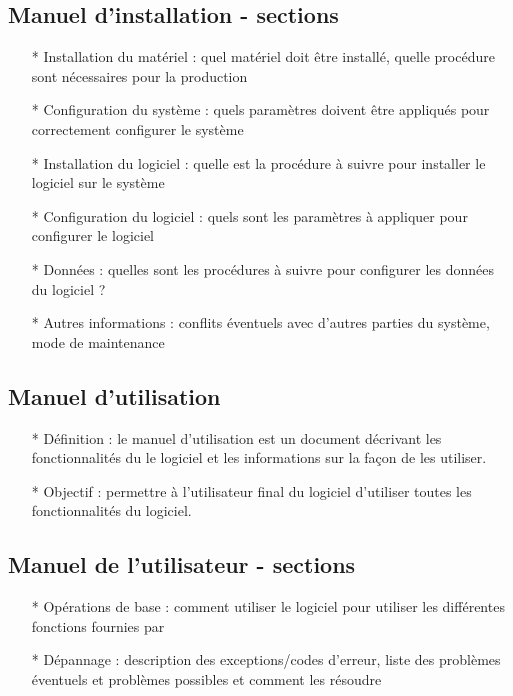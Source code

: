 \documentclass[12pt]{article}
\begin{document}
\subsection{Manuel d'installation - sections}
\begin{itemize}
	\item[* ] Installation du matériel : quel matériel doit être installé, quelle procédure
	sont nécessaires pour la production
	\item[* ] Configuration du système : quels paramètres doivent être appliqués pour correctement
	configurer le système
	\item[* ] Installation du logiciel : quelle est la procédure à suivre pour installer le logiciel sur le
	système
	\item[* ] Configuration du logiciel : quels sont les paramètres à appliquer pour 
	configurer le logiciel
	\item[* ] Données : quelles sont les procédures à suivre pour configurer les données du logiciel ?
	\item[* ] Autres informations : conflits éventuels avec d'autres parties du système,
	mode de maintenance
\end{itemize}
\subsection{Manuel d'utilisation}
\begin{itemize}
	\item[* ] Définition : le manuel d'utilisation est un document décrivant les fonctionnalités du
	le logiciel et les informations sur la façon de les utiliser.
	\item[* ] Objectif : permettre à l'utilisateur final du logiciel d'utiliser toutes les fonctionnalités du logiciel.

\end{itemize}
\subsection{Manuel de l'utilisateur - sections}
\begin{itemize}
	\item[* ] Opérations de base : comment utiliser le logiciel pour utiliser les différentes fonctions
	fournies par
	\item[* ] Dépannage : description des exceptions/codes d'erreur, liste des problèmes éventuels et
	problèmes possibles et comment les résoudre
\end{itemize}
\end{document}
